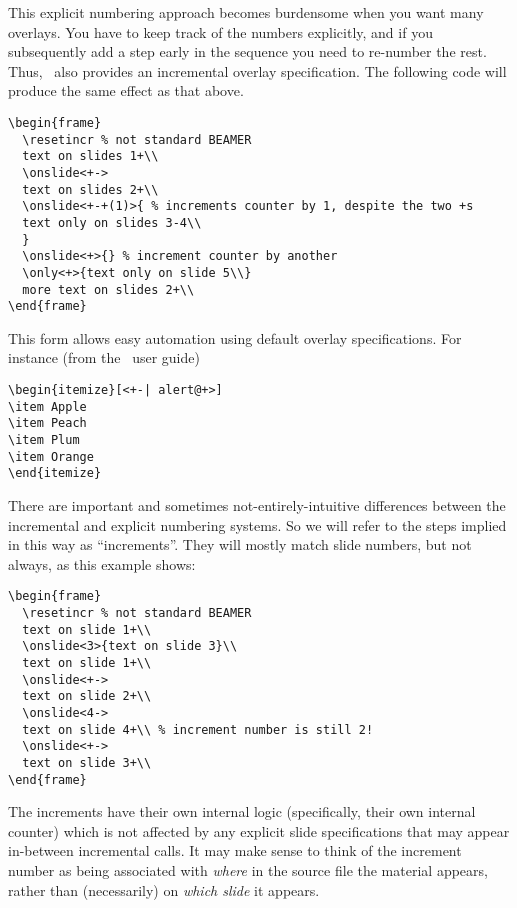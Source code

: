 \documentclass[a4paper]{ltxdoc}
\begin{document}
This explicit numbering approach becomes burdensome when you want many overlays.
You have to keep track of the numbers explicitly, and if you subsequently add a
step early in the sequence you need to re-number the rest.  Thus, \beamer\ also
provides an incremental overlay specification.  The following code will produce
the same effect as that above.  \example
\begin{verbatim}
\begin{frame}
  \resetincr % not standard BEAMER
  text on slides 1+\\
  \onslide<+->
  text on slides 2+\\
  \onslide<+-+(1)>{ % increments counter by 1, despite the two +s
  text only on slides 3-4\\
  } 
  \onslide<+>{} % increment counter by another
  \only<+>{text only on slide 5\\}
  more text on slides 2+\\
\end{frame}
\end{verbatim}
This form allows easy automation using default overlay specifications.  For
instance (from the \beamer\ user guide) \example
\begin{verbatim}
\begin{itemize}[<+-| alert@+>]
\item Apple
\item Peach
\item Plum
\item Orange
\end{itemize}
\end{verbatim}
There are important and sometimes not-entirely-intuitive differences between the
incremental and explicit numbering systems.  So we will refer to the steps
implied in this way as ``increments''.  They will mostly match slide numbers,
but not always, as this example shows: \example
\begin{verbatim}
\begin{frame}
  \resetincr % not standard BEAMER
  text on slide 1+\\
  \onslide<3>{text on slide 3}\\
  text on slide 1+\\
  \onslide<+->
  text on slide 2+\\
  \onslide<4->
  text on slide 4+\\ % increment number is still 2!
  \onslide<+->
  text on slide 3+\\
\end{frame}
\end{verbatim}
The increments have their own internal logic (specifically, their own internal
counter) which is not affected by any explicit slide specifications that may
appear in-between incremental calls.  It may make sense to think of the
increment number as being associated with \emph{where} in the source file the
material appears, rather than (necessarily) on \emph{which slide} it appears.
\end{document}
